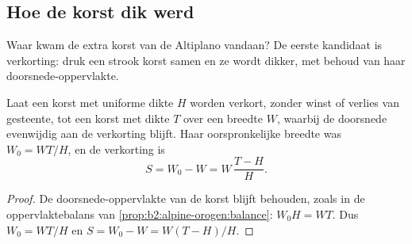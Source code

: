 \begin{omfigure}
\par{}
\end{omfigure}

\subsection{Hoe de korst dik werd}

Waar kwam de extra korst van de Altiplano vandaan? De eerste kandidaat is verkorting:
druk een strook korst samen en ze wordt dikker, met behoud van haar doorsnede-oppervlakte.

\begin{proposition}\label{prop:b2:himalaya-andes:shortening}
Laat een korst met uniforme dikte $H$ worden verkort, zonder winst of verlies van gesteente, tot een korst
met dikte $T$ over een breedte $W$, waarbij de doorsnede evenwijdig aan de verkorting blijft. Haar
oorspronkelijke breedte was $W_0 = W T/H$, en de verkorting is
\[
  S = W_0 - W = W\,\frac{T - H}{H} .
\]
\end{proposition}

\begin{proof}
De doorsnede-oppervlakte van de korst blijft behouden, zoals in de oppervlaktebalans van
\cref{prop:b2:alpine-orogen:balance}: $W_0 H = W T$. Dus $W_0 = WT/H$ en $S = W_0 - W =
W(T - H)/H$.
\end{proof}

